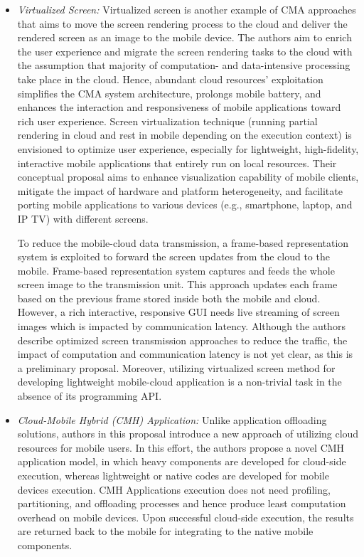 \documentclass[publish]{IEEEtran}
\begin{document}
\begin{itemize}
\item \textit{Virtualized Screen:}
Virtualized screen \cite{Lu2011} is another example of CMA approaches that aims to move the screen rendering process to the cloud and deliver the rendered screen as an image to the mobile device. The authors aim to enrich the user experience and migrate the screen rendering tasks to the cloud with the assumption that majority of computation- and data-intensive processing take place in the cloud. Hence, abundant cloud resources' exploitation simplifies the CMA system architecture, prolongs mobile battery, and enhances the interaction and responsiveness of mobile applications toward rich user experience. Screen virtualization technique (running partial rendering in cloud and rest in mobile depending on the execution context) is envisioned to optimize user experience, especially for lightweight, high-fidelity, interactive mobile applications that entirely run on local resources. Their conceptual proposal aims to enhance visualization capability of mobile clients, mitigate the impact of hardware and platform heterogeneity, and facilitate porting mobile applications to various devices (e.g., smartphone, laptop, and IP TV) with different screens. 

To reduce the mobile-cloud data transmission, a frame-based representation system is exploited to forward the screen updates from the cloud to the mobile. Frame-based representation system captures and feeds the whole screen image to the transmission unit. This approach updates each frame based on the previous frame stored inside both the mobile and cloud. However, a rich interactive, responsive GUI needs live streaming of screen images which is impacted by communication latency. Although the authors describe optimized screen transmission approaches to reduce the traffic, the impact of computation and communication latency is not yet clear, as this is a preliminary proposal. Moreover, utilizing virtualized screen method for developing lightweight mobile-cloud application is a non-trivial task in the absence of its programming API.

\item \textit{Cloud-Mobile Hybrid (CMH) Application:}
Unlike application offloading solutions, authors in this proposal \cite{A.Manjunatha2010} introduce a new approach of utilizing cloud resources for mobile users. In this effort, the authors propose a novel CMH application model, in which heavy components are developed for cloud-side execution, whereas lightweight or native codes are developed for mobile devices execution. CMH Applications execution does not need profiling, partitioning, and offloading processes and hence produce least computation overhead on mobile devices. Upon successful cloud-side execution, the results are returned back to the mobile for integrating to the native mobile components. 


\end{itemize}
\end{document}
